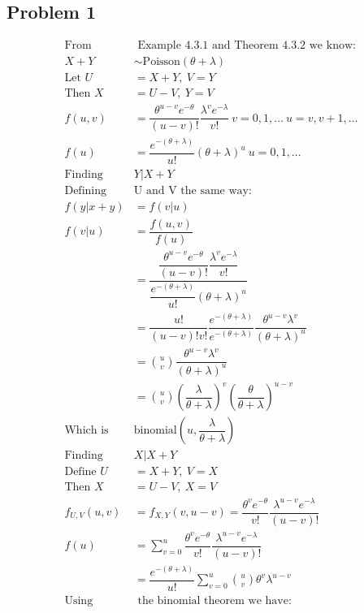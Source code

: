 \documentclass{article}
\begin{document}
\begin{flushleft}
\section*{Problem 1}
\begin{align*}
\text{From} &\text{ Example 4.3.1 and Theorem 4.3.2 we know:}\\
X+Y &\sim \text{Poisson}(\theta+\lambda)\\
\text{Let } U&=X+Y, \ V=Y\\
\text{Then } X&=U-V, \ Y=V\\
f(u,v)&=\dfrac{\theta^{u-v}e^{-\theta}}{(u-v)!}\dfrac{\lambda^{v} e^{-\lambda}}{v!} \ v=0,1,\dots \ u=v,v+1, \dots\\
f(u)&=\dfrac{e^{-(\theta+\lambda)}}{u!}(\theta+\lambda)^u \ u=0,1,\dots\\
\text{Finding } &Y|X+Y\\
\text{Defining }& \text{U and V the same way:}\\
f(y|x+y)&= f(v|u)\\
f(v|u)&=\dfrac{f(u,v)}{f(u)}\\
&=\dfrac{\dfrac{\theta^{u-v}e^{-\theta}}{(u-v)!}\dfrac{\lambda^v e^{-\lambda}}{v!}}{\dfrac{e^{-(\theta+\lambda)}}{u!}(\theta+\lambda)^u}\\
&=\dfrac{u!}{(u-v)!v!}\dfrac{e^{-(\theta+\lambda)}}{e^{-(\theta+\lambda)}}\dfrac{\theta^{u-v}\lambda^v}{(\theta+\lambda)^u}\\
&={u\choose v}\dfrac{\theta^{u-v}\lambda^v}{(\theta+\lambda)^u}\\
&={u\choose v}\left(\dfrac{\lambda}{\theta+\lambda}\right)^{v}\left(\dfrac{\theta}{\theta+\lambda}\right)^{u-v}\\
\text{Which is }& \text{binomial}\left(u,\dfrac{\lambda}{\theta+\lambda}\right)\\
\text{Finding } &X|X+Y\\
\text{Define } U&=X+Y, \ V=X\\
\text{Then } X&=U-V, \ X=V\\
f_{U,V}(u,v)&=f_{X,Y}(v,u-v)=\dfrac{\theta^v e^{-\theta}}{v!} \dfrac{\lambda^{u-v} e^{-\lambda}}{(u-v)!}\\
f(u)&=\sum_{v=0}^{u}\dfrac{\theta^v e^{-\theta}}{v!}\dfrac{\lambda^{u-v}e^{-\lambda}}{(u-v)!}\\
&=\dfrac{e^{-(\theta+\lambda)}}{u!}\sum_{v=0}^{u}{u \choose v}\theta^v \lambda^{u-v}\\
\text{Using}&\text{ the binomial theorem we have:}\\

\end{align*}
\end{flushleft}
\end{document}
